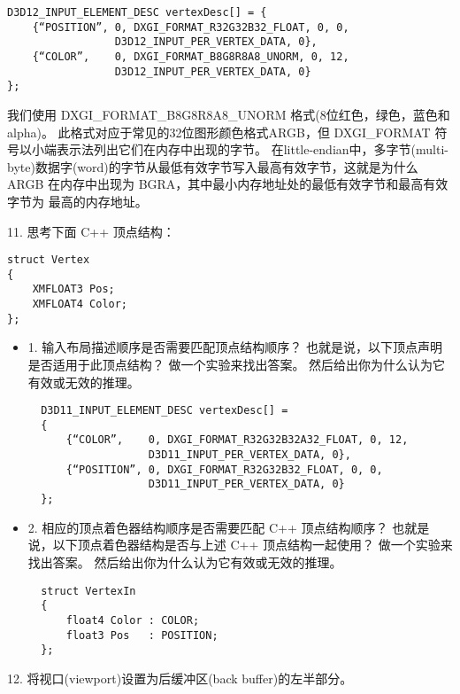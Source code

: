\begin{flushleft}
\begin{lstlisting}
D3D12_INPUT_ELEMENT_DESC vertexDesc[] = {
    {“POSITION”, 0, DXGI_FORMAT_R32G32B32_FLOAT, 0, 0, 
                 D3D12_INPUT_PER_VERTEX_DATA, 0},
    {“COLOR”,    0, DXGI_FORMAT_B8G8R8A8_UNORM, 0, 12,
                 D3D12_INPUT_PER_VERTEX_DATA, 0}
};
\end{lstlisting}
\begin{flushleft}
我们使用 DXGI\_FORMAT\_B8G8R8A8\_UNORM 格式(8位红色，绿色，蓝色和alpha)。 此格式对应于常见的32位图形颜色格式ARGB，但 DXGI\_FORMAT 符号以小端表示法列出它们在内存中出现的字节。 在little-endian中，多字节(multi-byte)数据字(word)的字节从最低有效字节写入最高有效字节，这就是为什么 ARGB 在内存中出现为 BGRA，其中最小内存地址处的最低有效字节和最高有效字节为 最高的内存地址。
\end{flushleft}

\begin{flushleft}
11. 思考下面 C++ 顶点结构：
\end{flushleft}
\begin{lstlisting}
struct Vertex
{
    XMFLOAT3 Pos;
    XMFLOAT4 Color;
};
\end{lstlisting}
\begin{itemize}
  \item 1. 输入布局描述顺序是否需要匹配顶点结构顺序？ 也就是说，以下顶点声明是否适用于此顶点结构？ 做一个实验来找出答案。 然后给出你为什么认为它有效或无效的推理。
  \begin{lstlisting}
  D3D11_INPUT_ELEMENT_DESC vertexDesc[] =
  {
      {“COLOR”,    0, DXGI_FORMAT_R32G32B32A32_FLOAT, 0, 12,
                   D3D11_INPUT_PER_VERTEX_DATA, 0},
      {“POSITION”, 0, DXGI_FORMAT_R32G32B32_FLOAT, 0, 0,
                   D3D11_INPUT_PER_VERTEX_DATA, 0}
  };
  \end{lstlisting}
  \item 2. 相应的顶点着色器结构顺序是否需要匹配 C++ 顶点结构顺序？ 也就是说，以下顶点着色器结构是否与上述 C++ 顶点结构一起使用？ 做一个实验来找出答案。 然后给出你为什么认为它有效或无效的推理。
  \begin{lstlisting}
  struct VertexIn
  {
      float4 Color : COLOR;
      float3 Pos   : POSITION;
  };
  \end{lstlisting}
\end{itemize}

\begin{flushleft}
12. 将视口(viewport)设置为后缓冲区(back buffer)的左半部分。
\end{flushleft}


\end{flushleft}
